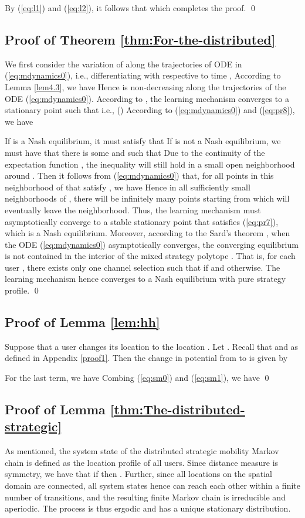 By (\ref{eq:l1}) and (\ref{eq:l2}), it follows that
which completes the proof. \qed

\subsection{Proof of Theorem \ref{thm:For-the-distributed}}\label{proof1-3}
We first consider the variation of  along
the trajectories of ODE in (\ref{eq:mdynamics0}), i.e., differentiating
 with respective to time , 
According to Lemma \ref{lem4.3}, we have 
Hence  is non-decreasing along the trajectories
of the ODE (\ref{eq:mdynamics0}). According to \cite{key-99}, the
learning mechanism converges to a stationary point
 such that 
i.e., ()
According to (\ref{eq:mdynamics0}) and (\ref{eq:pr8}), we have 


If  is a Nash equilibrium, it must satisfy
that
If  is not a Nash equilibrium, we must have
that there is some  and  such that 
Due to the continuity of the expectation function , the
inequality will still hold in a small open neighborhood around .
Then it follows from (\ref{eq:mdynamics0}) that, for all points 
in this neighborhood of  that satisfy ,
we have 
Hence in all sufficiently small neighborhoods of ,
there will be infinitely many points starting from which 
will eventually leave the neighborhood. Thus, the learning mechanism must asymptotically converge to a stable stationary
point  that satisfies (\ref{eq:pr7}), which is a Nash equilibrium. Moreover, according to the Sard's theorem \cite{schoen1994lectures}, when the ODE (\ref{eq:mdynamics0}) asymptotically converges, the converging equilibrium is not contained in the interior of the mixed strategy polytope \cite{kleinberg2009multiplicative}. That is, for each user , there exists only one channel selection  such that  if  and  otherwise.  The learning mechanism hence converges to a Nash equilibrium with pure strategy profile. \qed

\subsection{Proof of Lemma \ref{lem:hh}}\label{proof2}
Suppose that a user  changes its location  to the location
. Let .
Recall that  and   as defined in Appendix \ref{proof1}.
Then the change in potential  from  to  is given
by


For the last term, we have 
Combing (\ref{eq:sm0}) and (\ref{eq:sm1}), we have  \qed


\subsection{Proof of Lemma \ref{thm:The-distributed-strategic}} \label{proof3}
As mentioned, the system state of the distributed strategic mobility Markov chain is defined as the location profile
 of all users. Since distance measure is symmetry, we
have that if  then .
Further, since all locations on the spatial domain  are connected,
all system states  hence can reach each other within a finite
number of transitions, and the resulting finite Markov chain is irreducible
and aperiodic. The process is thus ergodic and has a unique stationary
distribution.

